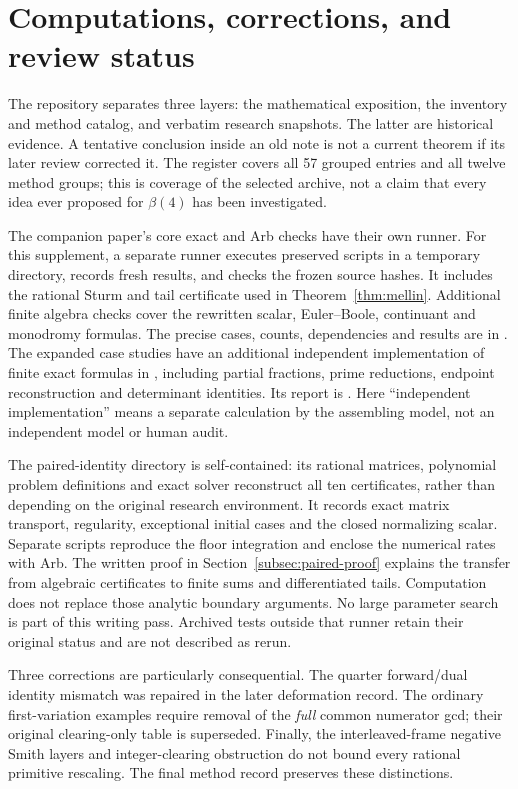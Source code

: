 \section{Computations, corrections, and review status}\label{sec:evidence}
The repository separates three layers: the mathematical exposition,
the inventory and method catalog, and verbatim research snapshots.
The latter are historical evidence. A tentative conclusion inside an old
note is not a current theorem if its later review corrected it.
The register covers all 57 grouped entries and all twelve method groups;
this is coverage of the selected archive, not a claim that every idea
ever proposed for $\beta(4)$ has been investigated.

The companion paper's core exact and Arb checks have their own runner.
For this supplement, a separate runner executes preserved scripts in a
temporary directory, records fresh results, and checks the frozen source
hashes. It includes the rational Sturm and tail certificate used in
Theorem~\ref{thm:mellin}. Additional finite algebra checks cover the
rewritten scalar, Euler--Boole, continuant and monodromy formulas.
The precise cases, counts, dependencies and results are in
. The expanded case studies
have an additional independent implementation of finite exact formulas
in , including partial fractions, prime
reductions, endpoint reconstruction and determinant identities. Its
report is . Here ``independent
implementation'' means a separate calculation by the assembling model,
not an independent model or human audit.

The paired-identity directory is self-contained: its rational matrices,
polynomial problem definitions and exact solver reconstruct all ten
certificates, rather than depending on the original research environment.
It records exact matrix transport, regularity, exceptional initial cases
and the closed normalizing scalar. Separate scripts reproduce the floor
integration and enclose the numerical rates with Arb. The written proof
in Section~\ref{subsec:paired-proof} explains the transfer from algebraic
certificates to finite sums and differentiated tails. Computation does
not replace those analytic boundary arguments. No large parameter search
is part of this writing pass. Archived tests outside that runner retain
their original status and are not described as rerun.

Three corrections are particularly consequential. The quarter
forward/dual identity mismatch was repaired in the later deformation
record. The ordinary first-variation examples require removal of the
\emph{full} common numerator gcd; their original clearing-only table
is superseded. Finally, the interleaved-frame negative Smith layers and
integer-clearing obstruction do not bound every rational primitive
rescaling. The final method record preserves these distinctions.

